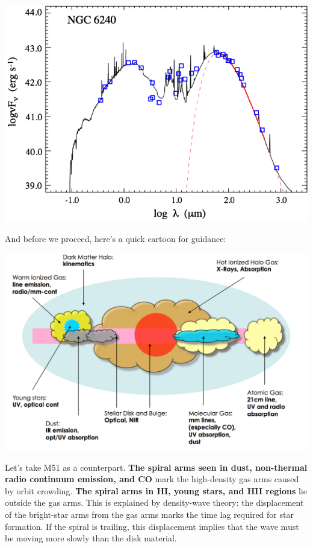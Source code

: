\documentclass[12pt, letterpaper, preprint]{aastex}
\begin{document}
\begin{enumerate}
\includegraphics[scale=1.0]{sed.png}

And before we proceed, here's a quick cartoon for guidance:

\includegraphics[scale=0.3]{galaxy-anatomy.png}

Let's take M51 as a counterpart.
\textbf{The spiral arms seen in dust, non-thermal radio continuum emission, and CO} mark the high-density gas arms caused by orbit crowding.
\textbf{The spiral arms in HI, young stars, and HII regions} lie outside the gas arms.
This is explained by density-wave theory: the displacement of the bright-star arms from the gas arms marks the time lag required for star formation. If the spiral is trailing, this displacement implies that the wave must be moving more slowly than the disk material.


\end{enumerate}
\end{document}
